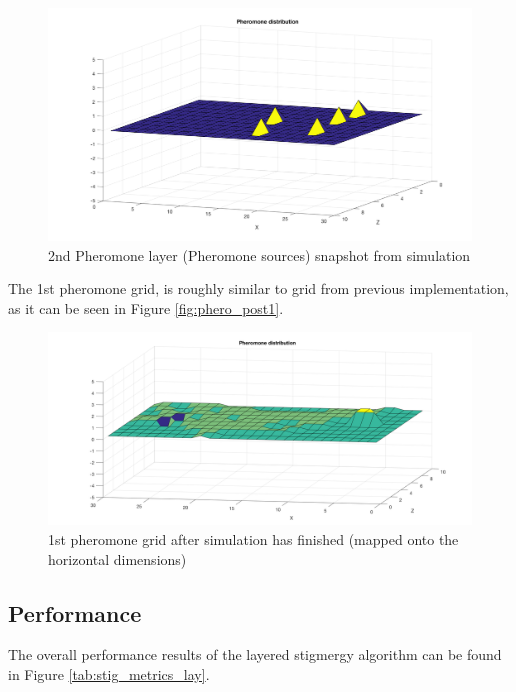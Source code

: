 \begin{figure}[H]
	\centering
	\includegraphics[width=1\columnwidth]{figures/STIG_source_pheromones}
  	\caption{\label{fig:sources}2nd Pheromone layer (Pheromone sources) snapshot from simulation}
\end{figure}

The 1st pheromone grid, is roughly similar to grid from previous implementation, as it can be seen in Figure \ref{fig:phero_post1}.

\begin{figure}[H]
	\centering
	\includegraphics[width=1\columnwidth]{figures/STIG_lay_grid1}
  	\caption{\label{fig:phero_post2}1st pheromone grid after simulation has finished (mapped onto the horizontal dimensions)} 
\end{figure}

\subsection{Performance}

The overall performance results of the layered stigmergy algorithm can be found in Figure \ref{tab:stig_metrics_lay}.

